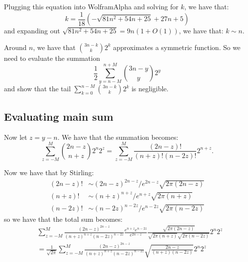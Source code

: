 \documentclass[]{article}
\theoremstyle{definition}
\numberwithin{theorem}{section}
\numberwithin{equation}{section}
\begin{document}
Plugging this equation into WolframAlpha and solving for $k$, we have that:
\begin{equation}
	k = \frac{1}{18}\left(- \sqrt{81 n^2 + 54 n + 25} + 27 n + 5\right)
\end{equation}
and expanding out $\sqrt{81 n^2 + 54 n + 25} = 9 n(1 + O(1))$, we have that:
$k \sim n$. 

Around $n$, we have that $\binom{3n - k}{k} 2^k$ approximates a symmetric function. So we need to evaluate the summation
\begin{equation}
	\frac{1}{2}\sum_{y = n - M}^{n + M} \binom{3n - y}{y} 2^y
\end{equation}
and show that the tail $\sum_{k = 0}^{n - M} \binom{3n - k}{k} 2^k$ is negligible.

\subsection{Evaluating main sum}
Now let $z = y - n$. We have that the summation becomes:
\begin{equation}
	\sum_{z = -M}^M \binom{2n - z}{n + z} 2^n 2^z = \sum_{z = -M}^M\frac{(2n - z)!}{(n + z)! (n - 2z)!} 2^{n + z}. 
\end{equation}

Now we have that by Stirling:
\begin{align*}
	(2n - z)! &\sim (2n - z)^{2n-z}/e^{2n - z} \sqrt{2 \pi (2n-z)}\\
	(n + z)! &\sim (n + z)^{n + z}/e^{n + z} \sqrt{2 \pi (n + z)}\\
	(n - 2z)! &\sim (n - 2z)^{n - 2z}/e^{n - 2z} \sqrt{2 \pi (n -2z)}
\end{align*}
so we have that the total sum becomes:
\begin{align*}
	&\sum_{z = -M}^M \frac{(2n - z)^{2n - z}}{(n + z)^{n + z} (n - 2z)^{n - 2z}} \frac{e^{n + z} e^{n - 2z}}{e^{2n - z}} \frac{\sqrt{2\pi (2n - z)}}{\sqrt{2\pi (n + z)} \sqrt{2\pi (n - 2z)}} 2^{n} 2^z \\
	&= \frac{1}{\sqrt{2\pi}}\sum_{z = -M}^M \frac{(2n - z)^{2n - z}}{(n + z)^{n + z} (n - 2z)^{n - 2z}} \sqrt{\frac{2n - z}{(n + z)(n - 2z)}} 2^{n} 2^z
\end{align*}
\end{document}
